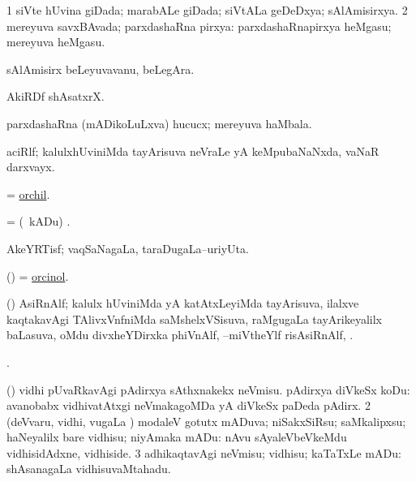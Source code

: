 \bentry
{}
\gl{\gu}
\bmng
\bnum
\num{1} siVte hUvina giDada; marabALe giDada; siVtALa geDeDxya; sAlAmisirxya. 
\num{2} mereyuva savxBAvada; parxdashaRna pirxya:  parxdashaRnapirxya heMgasu; mereyuva heMgasu. 
\enum
\emng
\eentry

\bentry
{}
\gl{\nA}
\bmng
sAlAmisirx beLeyuvavanu, beLegAra. 
\emng
\eentry

\bentry
{}
\gl{\nA}
\bmng
AkiRDf shAsatxrX. 
\emng
\eentry

\bentry
{}
\gl{\nA}
\bmng
parxdashaRna (mADikoLuLxva) hucucx; mereyuva haMbala. 
\emng
\eentry

\bentry
{}
\gl{\nA}
\bmng
aciRlf; kalulxhUviniMda tayArisuva neVraLe yA keMpubaNaNxda, vaNaR darxvayx. 
\emng
\eentry

\bentry
{}
\gl{\nA}
\bmng
= \hyperlink{orchil}{orchil}. 
\emng
\eentry

\bentry
{}
\gl{\nA}
\bmng
= (\sA\ kADu) . 
\emng
\eentry

\bentry
{}
\gl{\nA}
\bmng
AkeYRTisf; vaqSaNagaLa, taraDugaLa--uriyUta. 
\emng
\eentry

\bentry
{}
\gl{\nA}
\bmng
(\ravi) = \hyperlink{orcinol}{orcinol}. 
\emng
\eentry

\bentry
{}
\gl{\nA}
\bmng
(\ravi) AsiRnAlf; kalulx hUviniMda yA katAtxLeyiMda tayArisuva, ilalxve kaqtakavAgi TAlivxVnfniMda saMshelxVSisuva, raMgugaLa tayArikeyalilx baLasuva, oMdu divxheYDirxka phiVnAlf, --miVtheYlf risAsiRnAlf, . 
\emng
\eentry

\bentry
{}
\gl{\saMkiSx}
\bmng
{}. 
\emng
\eentry

\bentry
{}
\gl{\sakirx}
\bmng
\bnum
{} (\kerxY) 
\banum
{} vidhi pUvaRkavAgi pAdirxya sAthxnakekx neVmisu. 
 pAdirxya diVkeSx koDu:  avanobabx vidhivatAtxgi neVmakagoMDa yA diVkeSx paDeda pAdirx. 
\eanum
\numie
\num{2} (deVvaru, vidhi, \mo vugaLa \vi) modaleV gotutx mADuva; niSakxSiRsu; saMkalipxsu; haNeyalilx bare vidhisu; niyAmaka mADu:  nAvu sAyaleVbeVkeMdu vidhisidAdxne, vidhiside. 
\num{3} adhikaqtavAgi neVmisu; vidhisu; kaTaTxLe mADu:  shAsanagaLa vidhisuvaMtahadu. 
\enum
\emng
\eentry

